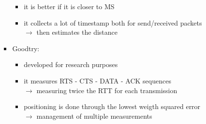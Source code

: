 \begin{itemize}
\begin{itemize}
\begin{itemize}
\begin{itemize}
                \item it is better if it is closer to MS
                \item it collects a lot of timestamp both for send/received packets\\
                $\rightarrow$ then estimates the distance 
            \end{itemize}
            \item Goodtry:
            \begin{itemize}
                \item developed for research purposes
                \item it measures RTS - CTS - DATA - ACK sequences\\[0.15cm]
                $\rightarrow$ measuring twice the RTT for each transmission
                \item positioning is done through the lowest weigth squared error\\[0.15cm]
                $\rightarrow$ management of multiple measurements
            \end{itemize}
        \end{itemize}
    \end{itemize}
\end{itemize}
